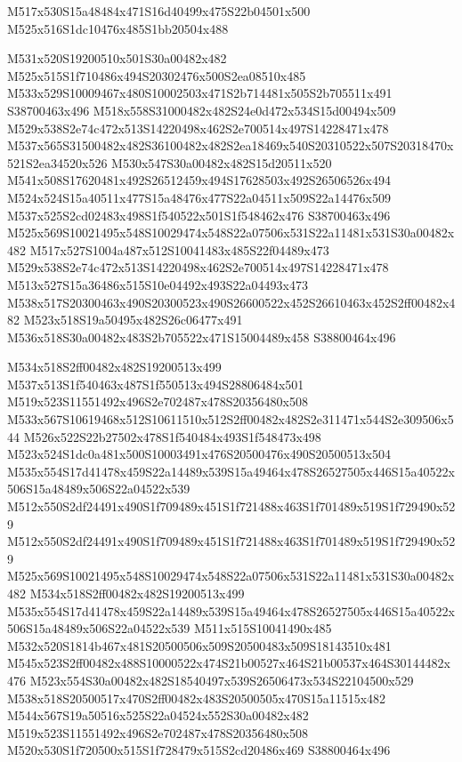 \documentclass{article}
\begin{document}
\begin{multicols}{2}
\begin{center}
M517x530S15a48484x471S16d40499x475S22b04501x500 M525x516S1dc10476x485S1bb20504x488 
\end{center}


M531x520S19200510x501S30a00482x482 M525x515S1f710486x494S20302476x500S2ea08510x485 M533x529S10009467x480S10002503x471S2b714481x505S2b705511x491 S38700463x496 M518x558S31000482x482S24e0d472x534S15d00494x509 M529x538S2e74c472x513S14220498x462S2e700514x497S14228471x478 M537x565S31500482x482S36100482x482S2ea18469x540S20310522x507S20318470x521S2ea34520x526 M530x547S30a00482x482S15d20511x520 M541x508S17620481x492S26512459x494S17628503x492S26506526x494 M524x524S15a40511x477S15a48476x477S22a04511x509S22a14476x509 M537x525S2cd02483x498S1f540522x501S1f548462x476 S38700463x496 M525x569S10021495x548S10029474x548S22a07506x531S22a11481x531S30a00482x482 M517x527S1004a487x512S10041483x485S22f04489x473 M529x538S2e74c472x513S14220498x462S2e700514x497S14228471x478 M513x527S15a36486x515S10e04492x493S22a04493x473 M538x517S20300463x490S20300523x490S26600522x452S26610463x452S2ff00482x482 M523x518S19a50495x482S26c06477x491 M536x518S30a00482x483S2b705522x471S15004489x458 S38800464x496

M534x518S2ff00482x482S19200513x499 M537x513S1f540463x487S1f550513x494S28806484x501 M519x523S11551492x496S2e702487x478S20356480x508 M533x567S10619468x512S10611510x512S2ff00482x482S2e311471x544S2e309506x544 M526x522S22b27502x478S1f540484x493S1f548473x498 M523x524S1dc0a481x500S10003491x476S20500476x490S20500513x504 M535x554S17d41478x459S22a14489x539S15a49464x478S26527505x446S15a40522x506S15a48489x506S22a04522x539 M512x550S2df24491x490S1f709489x451S1f721488x463S1f701489x519S1f729490x529 M512x550S2df24491x490S1f709489x451S1f721488x463S1f701489x519S1f729490x529 M525x569S10021495x548S10029474x548S22a07506x531S22a11481x531S30a00482x482 M534x518S2ff00482x482S19200513x499 M535x554S17d41478x459S22a14489x539S15a49464x478S26527505x446S15a40522x506S15a48489x506S22a04522x539 M511x515S10041490x485 M532x520S1814b467x481S20500506x509S20500483x509S18143510x481 M545x523S2ff00482x488S10000522x474S21b00527x464S21b00537x464S30144482x476 M523x554S30a00482x482S18540497x539S26506473x534S22104500x529 M538x518S20500517x470S2ff00482x483S20500505x470S15a11515x482 M544x567S19a50516x525S22a04524x552S30a00482x482 M519x523S11551492x496S2e702487x478S20356480x508 M520x530S1f720500x515S1f728479x515S2cd20486x469 S38800464x496


\end{multicols}
\end{document}

